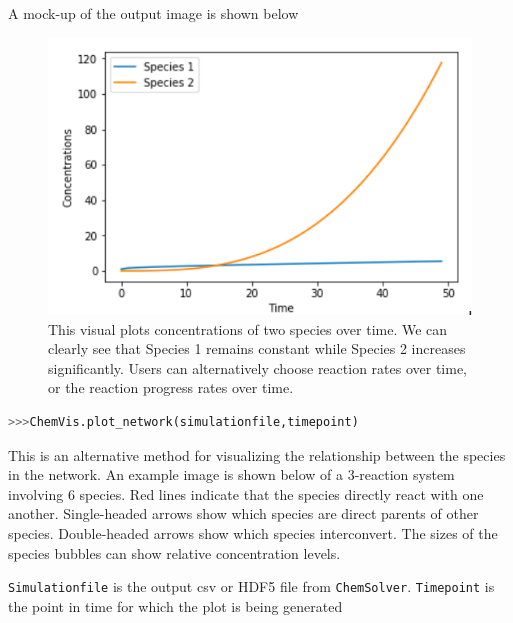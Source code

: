 \documentclass[12pt]{article}
\begin{document}
A mock-up of the output image is shown below



\begin{figure}[h!]
  \caption{This visual plots concentrations of two species over time. We can clearly see that Species 1 remains constant while Species 2 increases significantly. Users can alternatively choose reaction rates over time, or the reaction progress rates over time. }
  \centering
  \includegraphics[width=\textwidth]{pic1.png}
\end{figure}

\begin{lstlisting}[language = Python, basicstyle = \ttfamily, breaklines = True, columns = fullflexible]
>>>ChemVis.plot_network(simulationfile,timepoint)
\end{lstlisting}

This is an alternative method for visualizing the relationship between the species in the network. 
An example image is shown below of a 3-reaction system involving 6 species. Red lines indicate that the species directly react with one another. Single-headed arrows show which species are direct parents of other species. Double-headed arrows show which species interconvert. The sizes of the species bubbles can show relative concentration levels. 

\texttt{Simulationfile} is the output csv or HDF5 file from \texttt{ChemSolver}. \texttt{Timepoint} is the point in time for which the plot is being generated
\end{document}
